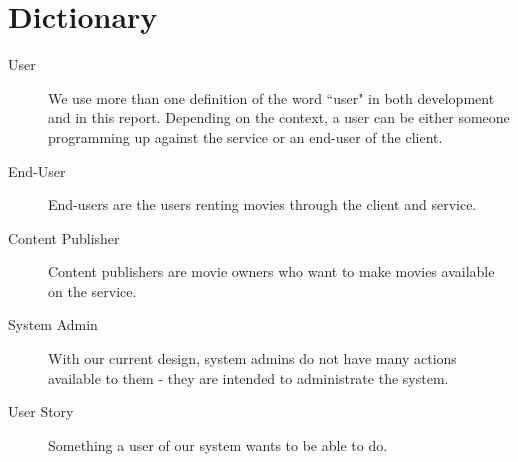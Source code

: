 \chapter{Dictionary}
\begin{description}
\item[User] We use more than one definition of the word ``user" in both development and in this report. Depending on the context, a user can be either someone programming up against the service or an end-user of the client.
\item[End-User] End-users are the users renting movies through the client and service.
\item[Content Publisher] Content publishers are movie owners who want to make movies available on the service.
\item[System Admin] With our current design, system admins do not have many actions available to them - they are intended to administrate the system.
\item[User Story] Something a user of our system wants to be able to do.
\end{description}